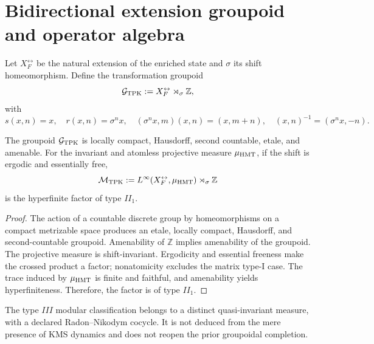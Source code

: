 \section{Bidirectional extension groupoid and operator algebra}
\label{sec:cpe-grupoide-two-way}

Let \(X_F^{\leftrightarrow}\) be the natural extension of the enriched state and
\(\sigma\) its shift homeomorphism. Define the transformation
groupoid
\begin{equation}
 \mathcal G_{\rm TPK}
 :=X_F^{\leftrightarrow}\rtimes_\sigma\mathbb Z,
 \label{eq:cpe-grupoide-tpk}
\end{equation}
with
\[
 s(x,n)=x,
 \quad r(x,n)=\sigma^n x,
 \quad (\sigma^nx,m)(x,n)=(x,m+n),
 \quad (x,n)^{-1}=(\sigma^nx,-n).
\]

\begin{theorem}
\label{thm:cpe-grupoide-tpk}
The groupoid \(\mathcal G_{\rm TPK}\) is locally compact, Hausdorff,
second countable, etale, and amenable. For the invariant and
atomless projective measure \(\mu_{\rm HMT}\), if the shift is ergodic and
essentially free,
\[
 \mathcal M_{\rm TPK}
 :=L^\infty(X_F^{\leftrightarrow},\mu_{\rm HMT})
 \rtimes_\sigma\mathbb Z
\]
is the hyperfinite factor of type \(II_1\).
\end{theorem}

\begin{proof}
The action of a countable discrete group by homeomorphisms on a compact
metrizable space produces an etale, locally compact, Hausdorff, and
second-countable groupoid. Amenability of \(\mathbb Z\) implies amenability
of the groupoid. The projective measure is shift-invariant.
Ergodicity and essential freeness make the crossed product a factor;
nonatomicity excludes the matrix type-I case. The trace induced by
\(\mu_{\rm HMT}\) is finite and faithful, and amenability yields
hyperfiniteness. Therefore, the factor is of type \(II_1\).
\end{proof}

The type \(III\) modular classification belongs to a distinct
quasi-invariant measure, with a declared Radon--Nikodym cocycle. It is not
deduced from the mere presence of KMS dynamics and does not reopen the prior
groupoidal completion.
